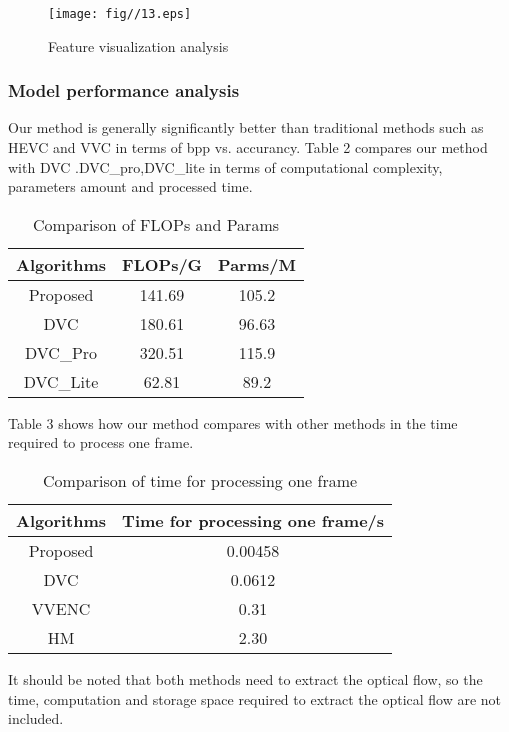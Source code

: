 \documentclass[a4paper]{cas-sc}
\begin{document}
\begin{figure}[ht]
	\centering
		\texttt{[image: fig//13.eps]}
	  \caption{Feature visualization analysis}\label{fig.13}
\end{figure}

\subsubsection{Model performance analysis}
Our method is generally significantly better than traditional methods such as HEVC and VVC in terms of bpp vs. accurancy. 
Table 2 compares our method with DVC .DVC\_pro,DVC\_lite in terms of computational complexity, parameters amount and processed time.\\

\begin{table}[!ht]
  \centering
  \begin{tabular}{ccc}
    \toprule
    Algorithms & FLOPs/G & Parms/M  \\
    \midrule
    Proposed & 141.69 & 105.2 \\
    DVC & 180.61 & 96.63 \\
    DVC\_Pro & 320.51 & 115.9 \\
    DVC\_Lite & 62.81 & 89.2 \\
    \bottomrule
  \end{tabular}
  \caption{Comparison of FLOPs and Params}\label{tab.2}
\end{table}



       

Table 3 shows how our method compares with other methods in the time required to process one frame.\\

\begin{table}[!ht]
  \centering
  \begin{tabular}{cc}
    \toprule
    Algorithms & Time for processing one frame/s \\
    \midrule
    Proposed & 0.00458 \\
    DVC & 0.0612 \\
    VVENC & 0.31 \\
    HM & 2.30 \\
    \bottomrule
  \end{tabular}
  \caption{Comparison of time for processing one frame}\label{tab.3}
\end{table}

It should be noted that both methods need to extract the optical flow, 
so the time, computation and storage space required to extract the optical flow are not included.\\
\end{document}
